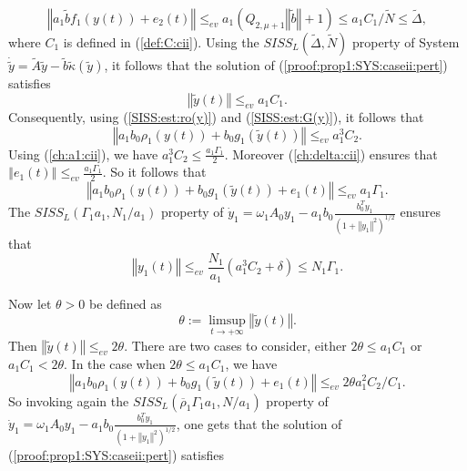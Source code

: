 \documentclass[letterpaper, 10pt]{article}
\newcommand{\rref}[1]{(\ref{#1})}
\newcommand{\norme}[1]{\left\Vert #1\right\Vert}
\begin{document}
\begin{equation*}
\norme{a_1  \tilde{b} f_1(y(t)) + e_2(t) }\leq_{ev}  a_1(Q_{2,\mu +1} \norme{\tilde{b}} + 1) \leq a_1 C_1 / \tilde{N} \leq \tilde{\Delta} ,
\end{equation*} where $C_1$ is defined in \rref{def:C:cii}. Using the $ SISS_L( \tilde{\Delta}, \tilde{N} )$ property of System $\dot{\tilde{y}} = \tilde{A} \tilde{y}  - \tilde{b}  \tilde{\kappa} (\tilde{y})$, it follows  that the solution of \rref{proof:prop1:SYS:caseii:pert} satisfies 
$$\norme{\tilde{y}(t)} \leq_{ev} a_1 C_1. $$ 
Consequently, using \rref{SISS:est:ro(y)} and \rref{SISS:est:G(y)}, it follows that
\begin{equation}
\norme{a_1 b_0 \rho_1(y(t)) + b_0 g_1(\tilde{y}(t))}\leq_{ev} a_1^3 C_2.
\end{equation}
Using \rref{ch:a1:cii}, we have $a_1^3 C_2 \leq  \frac{a_1  \Gamma_1 }{2}$. Moreover \rref{ch:delta:cii} ensures that $\norme{e_1(t)} \leq_{ev }   \frac{a_1  \Gamma_1 }{2}$. So it follows that
\begin{equation*}
\norme{a_1 b_0 \rho_1(y(t)) + b_0 g_1(\tilde{y}(t)) + e_1(t) } \leq_{ev}  a_1  \Gamma_1. 
\end{equation*} The $SISS_L( \Gamma_1 a_1  , N_1 / a_1 ) $ property of $\dot{y}_1 = \omega_1 A_0 y_1  -  a_1 b_0 \frac{b_0^T y_1}{(1 + \norme{y_1}^2 )^{1/2}} $ ensures that
\begin{equation}
\label{est:y_1:cii:1}
\norme{y_1(t) } \leq_{ev} \frac{N_1 }{a_1} (a_1^3 C_2 + \delta)  \leq  N_1 \Gamma_1.
\end{equation}

Now let $\theta >0$ be defined as
\begin{equation}
\label{eq:proof:prop1:limsup}
\theta := \limsup_{t \rightarrow + \infty} \norme{\tilde{y}(t)} .
\end{equation} Then $ \norme{\tilde{y}(t)} \leq_{ev} 2 \theta$. There are two cases to consider, either $2 \theta \leq a_1 C_1$ or $ a_1 C_1 < 2 \theta $. In the case when $2 \theta \leq a_1 C_1$, we have
\begin{equation*}
\norme{a_1 b_0 \rho_1(y(t)) + b_0 g_1(\tilde{y}(t)) + e_1(t) } \leq_{ev}  2 \theta a_1^2 C_2 / C_1.
\end{equation*} So invoking again the $SISS_L(\overline{\rho}_1 \Gamma_1 a_1  , N / a_1 ) $ property of $\dot{y}_1 = \omega_1 A_0 y_1  -  a_1 b_0 \frac{b_0^T y_1}{(1 + \norme{y_1}^2 )^{1/2}} $, one gets that the solution of \rref{proof:prop1:SYS:caseii:pert} satisfies
\end{document}
